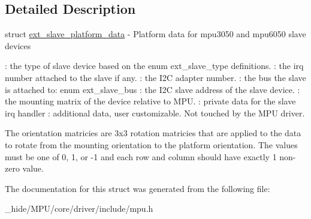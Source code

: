 \subsection{Detailed Description}
struct \hyperlink{structext__slave__platform__data}{ext\+\_\+slave\+\_\+platform\+\_\+data} -\/ Platform data for mpu3050 and mpu6050 slave devices

\+: the type of slave device based on the enum ext\+\_\+slave\+\_\+type definitions. \+: the irq number attached to the slave if any. \+: the I2\+C adapter number. \+: the bus the slave is attached to\+: enum ext\+\_\+slave\+\_\+bus \+: the I2\+C slave address of the slave device. \+: the mounting matrix of the device relative to M\+P\+U. \+: private data for the slave irq handler \+: additional data, user customizable. Not touched by the M\+P\+U driver.

The orientation matricies are 3x3 rotation matricies that are applied to the data to rotate from the mounting orientation to the platform orientation. The values must be one of 0, 1, or -\/1 and each row and column should have exactly 1 non-\/zero value. 

The documentation for this struct was generated from the following file\+:\begin{DoxyCompactItemize}
\item 
\+\_\+hide/\+M\+P\+U/core/driver/include/mpu.\+h\end{DoxyCompactItemize}
